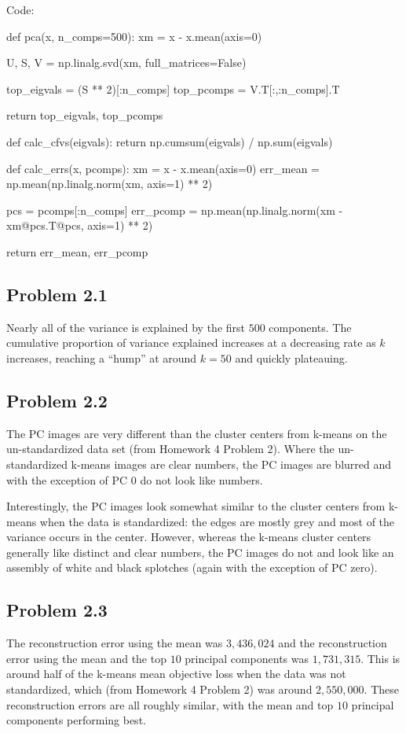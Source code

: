 \documentclass[submit]{harvardml}
\begin{document}
Code:

\begin{python}
def pca(x, n_comps=500):
    xm = x - x.mean(axis=0)

    U, S, V = np.linalg.svd(xm, full_matrices=False)

    top_eigvals = (S ** 2)[:n_comps]
    top_pcomps = V.T[:,:n_comps].T

    return top_eigvals, top_pcomps


def calc_cfvs(eigvals):
    return np.cumsum(eigvals) / np.sum(eigvals)


def calc_errs(x, pcomps):
    xm = x - x.mean(axis=0)
    err_mean = np.mean(np.linalg.norm(xm, axis=1) ** 2)

    pcs = pcomps[:n_comps]
    err_pcomp = np.mean(np.linalg.norm(xm - xm@pcs.T@pcs, axis=1) ** 2)

    return err_mean, err_pcomp
\end{python}

\subsection*{Problem 2.1}

Nearly all of the variance is explained by the first $500$ components. The cumulative proportion of variance explained increases at a decreasing rate as $k$ increases, reaching a ``hump'' at around $k=50$ and quickly plateauing.

\subsection*{Problem 2.2}

The PC images are very different than the cluster centers from k-means on the un-standardized data set (from Homework 4 Problem 2). Where the un-standardized k-means images are clear numbers, the PC images are blurred and with the exception of PC 0 do not look like numbers.

Interestingly, the PC images look somewhat similar to the cluster centers from k-means when the data is standardized: the edges are mostly grey and most of the variance occurs in the center. However, whereas the k-means cluster centers generally like distinct and clear numbers, the PC images do not and look like an assembly of white and black splotches (again with the exception of PC zero).

\subsection*{Problem 2.3}
The reconstruction error using the mean was $3,436,024$ and the reconstruction error using the mean and the top $10$ principal components was $1,731,315$. This is around half of the k-means mean objective loss when the data was not standardized, which (from Homework 4 Problem 2) was around $2,550,000$. These reconstruction errors are all roughly similar, with the mean and top $10$ principal components performing best.
\end{document}
